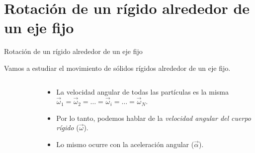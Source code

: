 \documentclass[11pt,handout,aspectratio=1610]{beamer}
\begin{document}
\section{Rotación de un rígido alrededor de un eje fijo}

\begin{frame}{Rotación de un rígido alrededor de un eje fijo}

    Vamos a estudiar el movimiento de sólidos rígidos alrededor de un eje fijo. \pause

\begin{columns}
    \begin{column}{0.3\textwidth}
        \begin{figure}
            \centering
        \end{figure}
    \end{column} \pause
    \begin{column}{0.7\textwidth}
        \begin{itemize}
            \item La velocidad angular de todas las partículas es la misma $\vec{\omega}_1 = \vec{\omega}_2 = \ldots = \vec{\omega}_i = \ldots = \vec{\omega}_N$. \pause 
            \item Por lo tanto, podemos hablar de la \emph{velocidad angular del cuerpo rígido} ($\vec{\omega}$). \pause
            \item Lo mismo ocurre con la aceleración angular ($\vec{\alpha}$).
        \end{itemize}
    \end{column}
\end{columns}

\end{frame}
\end{document}
